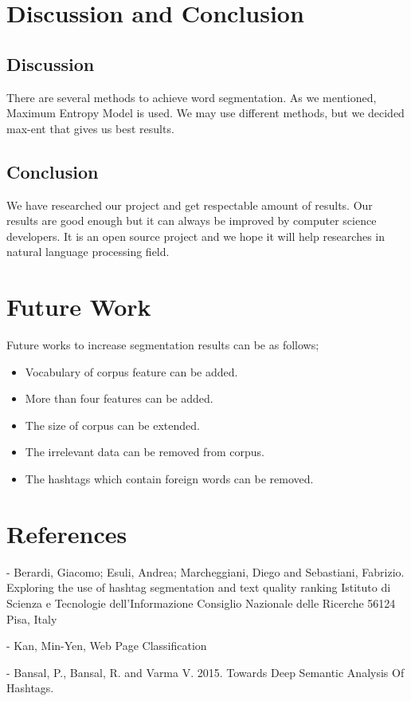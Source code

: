 \documentclass[12pt]{comjnl}
\begin{document}
\section{Discussion and Conclusion}
\subsection{Discussion}
There are several methods to achieve word segmentation. As we mentioned, Maximum Entropy Model is used. We may use different methods, but we decided max-ent that gives us best results.

\subsection{Conclusion}
We have researched our project and get respectable amount of results. Our results are good enough but it can always be improved by computer science developers. It is an open source project and we hope it will help researches in natural language processing field.

\section{Future Work}
Future works to increase segmentation results can be as follows;
\begin{itemize}
\item Vocabulary of corpus feature can be added.
\item More than four features can be added.
\item The size of corpus can be extended.
\item The irrelevant data can be removed from corpus.
\item The hashtags which contain foreign words can be removed.
\end{itemize}

\section{References}
- Berardi, Giacomo; Esuli, Andrea; Marcheggiani, Diego and Sebastiani, Fabrizio. Exploring the use of hashtag segmentation and text quality ranking 
Istituto di Scienza e Tecnologie dell’Informazione Consiglio Nazionale delle Ricerche 56124 Pisa, Italy

- Kan, Min-Yen, Web Page Classification

- Bansal, P., Bansal, R. and Varma V. 2015. Towards
Deep Semantic Analysis Of Hashtags.
\end{document}
